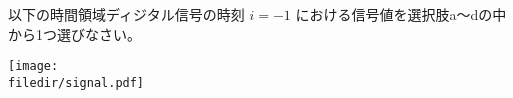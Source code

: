 以下の時間領域ディジタル信号の時刻 $i = -1$ における信号値を選択肢a〜dの中から1つ選びなさい。

\centering\texttt{[image: \\filedir/signal.pdf]}
